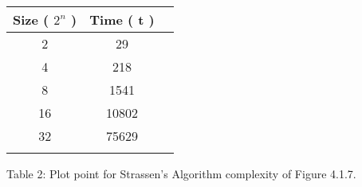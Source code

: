 {\bfseries\itshape\color{carmine}{Observation:}} {\itshape{}} \hfill \break

\begin{center}
{\Large
\begin{tabular}[.5cm]{ c c c }
\toprule
Size ( $2^{n}$ ) & Time ( t ) \\
\midrule
2 & 29 \\
\cmidrule {1-2}
4 & 218 \\
\cmidrule {1-2}
8 & 1541 \\
\cmidrule {1-2}
16 & 10802 \\
\cmidrule {1-2}
32 & 75629 \\
\bottomrule
\linebreak
\end{tabular}}
\linebreak \linebreak Table 2: Plot point for Strassen's Algorithm complexity of Figure 4.1.7.
\end{center}

\pagebreak
